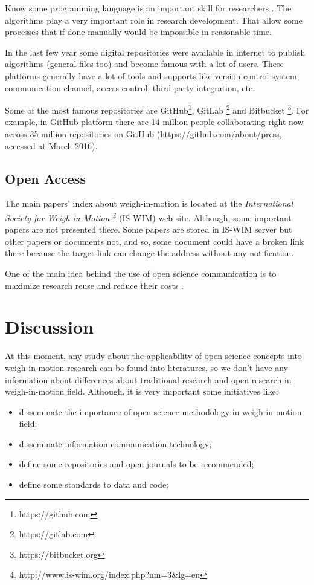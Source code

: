 \documentclass[a4paper]{article}
\begin{document}
{Know some programming language is an important skill for researchers \cite{ayer2014scientists}. The algorithms play a very important role in research development. That allow some processes that if done manually would be impossible in reasonable time.

In the last few year some digital repositories were available in internet to publish algorithms (general files too) and become famous with a lot of users. These platforms generally have a lot of tools and supports like version control system, communication channel, access control, third-party integration, etc.

Some of the most famous repositories are GitHub\footnote{https://github.com}, GitLab \footnote{https://gitlab.com} and Bitbucket \footnote{https://bitbucket.org}. For example, in GitHub platform there are 14 million people collaborating right now across 35 million repositories on GitHub (https://github.com/about/press, accessed at March 2016).
 
\subsection{Open Access}\label{open-access}

The main papers' index	about weigh-in-motion is located at the \textit{International Society for Weigh in Motion \footnote{http://www.is-wim.org/index.php?nm=3$\&$lg=en}} (IS-WIM) web site. Although, some important papers are not presented there. Some papers are stored in IS-WIM server but other papers or documents not, and so, some document could have a broken link there because the target link can change the address without any notification. 

One of the main idea behind the use of open science communication is to maximize research reuse and reduce their costs \cite{assante2015science}.



\section{Discussion}\label{discussion}

At this moment, any study about the applicability of open science concepts into weigh-in-motion research can be found into literatures, so we don't have any information about differences about traditional research and open research in weigh-in-motion field. Although, it is very important some initiatives like:

\begin{itemize}
\item disseminate the importance of open science methodology in weigh-in-motion field;
\item disseminate information communication technology;
\item define some repositories and open journals to be recommended;
\item define some standards to data and code;
\end{itemize}

}
\end{document}

